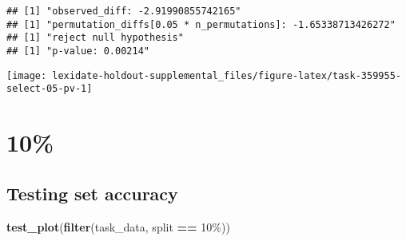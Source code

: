 \documentclass[
]{book}
\newenvironment{Shaded}{\begin{snugshade}}{\end{snugshade}}
\newcommand{\AttributeTok}[1]{\textcolor[rgb]{0.13,0.29,0.53}{#1}}
\newcommand{\DecValTok}[1]{\textcolor[rgb]{0.00,0.00,0.81}{#1}}
\newcommand{\FunctionTok}[1]{\textcolor[rgb]{0.13,0.29,0.53}{\textbf{#1}}}
\newcommand{\NormalTok}[1]{#1}
\newcommand{\OtherTok}[1]{\textcolor[rgb]{0.56,0.35,0.01}{#1}}
\newcommand{\SpecialCharTok}[1]{\textcolor[rgb]{0.81,0.36,0.00}{\textbf{#1}}}
\newcommand{\StringTok}[1]{\textcolor[rgb]{0.31,0.60,0.02}{#1}}
\begin{document}
\begin{Shaded}
\end{Shaded}

\begin{verbatim}
## [1] "observed_diff: -2.91990855742165"
## [1] "permutation_diffs[0.05 * n_permutations]: -1.65338713426272"
## [1] "reject null hypothesis"
## [1] "p-value: 0.00214"
\end{verbatim}

\texttt{[image: lexidate-holdout-supplemental\_files/figure-latex/task-359955-select-05-pv-1]}

\hypertarget{section-11}{%
\section{10\%}\label{section-11}}

\hypertarget{testing-set-accuracy-11}{%
\subsection{Testing set accuracy}\label{testing-set-accuracy-11}}

\begin{Shaded}
\begin{Highlighting}[]
\FunctionTok{test\_plot}\NormalTok{(}\FunctionTok{filter}\NormalTok{(task\_data, split }\SpecialCharTok{==} \StringTok{\textquotesingle{}10\%\textquotesingle{}}\NormalTok{))}
\end{Highlighting}
\end{Shaded}
\end{document}
